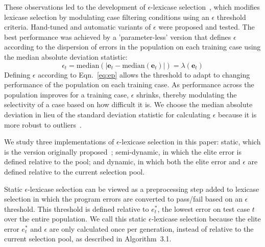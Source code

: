 \documentclass[twoside]{article}
\begin{document}
These observations led to the development of $\epsilon$-lexicase selection~\citep{la_cava_epsilon-lexicase_2016}, which modifies lexicase selection by modulating case filtering conditions using an $\epsilon$ threshold criteria. Hand-tuned and automatic variants of $\epsilon$ were proposed and tested. The best performance was achieved by a 'parameter-less' version that defines $\epsilon$ according to the dispersion of errors in the population on each training case using the median absolute deviation statistic:  
\begin{equation}\label{eq:ep}
\epsilon_t = \text{median}(|\mathbf{e}_t - \text{median}(\mathbf{e}_t)|) = \lambda(\mathbf{e}_t)
\end{equation}
Defining $\epsilon$ according to Eqn.~\ref{eq:ep} allows the threshold to adapt to changing performance of the population on each training case. As performance across the population improves for a training case, $\epsilon$ shrinks, thereby modulating the selectivity of a case based on how difficult it is. We choose the median absolute deviation in lieu of the standard deviation statistic for calculating $\epsilon$ because it is more robust to outliers~\citep{pham-gia_mean_2001}. 

We study three implementations of $\epsilon$-lexicase selection in this paper: static, which is the version originally proposed~\citep{la_cava_automatic_2016}; semi-dynamic, in which the elite error is defined relative to the pool; and dynamic, in which both the elite error and $\epsilon$ are defined relative to the current selection pool. 

Static $\epsilon$-lexicase selection can be viewed as a preprocessing step added to lexicase selection in which the program errors are converted to pass/fail based on an $\epsilon$ threshold. This threshold is defined relative to $e^*_t$, the lowest error on test case $t$ over the entire population. We call this static $\epsilon$-lexicase selection because the elite error $e^*_t$ and $\epsilon$ are only calculated once per generation, instead of relative to the current selection pool, as described in Algorithm~3.1.
\end{document}

